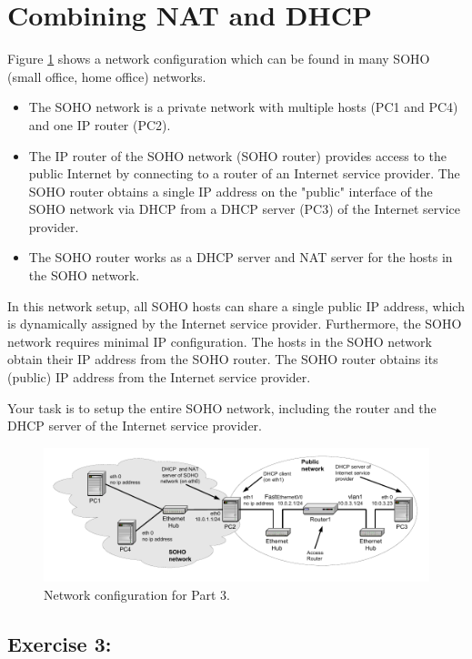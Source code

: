 \newpage
\section{Combining NAT and DHCP}

Figure \ref{fig:lab7-part3} shows a network configuration which can be found in many SOHO (small office, home office) networks.

\begin{itemize}
	\item The SOHO network is a private network with multiple hosts (PC1 and PC4) and one IP router (PC2).
	\item The IP router of the SOHO network (SOHO router) provides access to the public Internet by connecting to a router of an Internet service provider. The SOHO router obtains a single IP address on the "public" interface of the SOHO network via DHCP from a DHCP server (PC3) of the Internet service provider.
	\item The SOHO router works as a DHCP server and NAT server for the hosts in the SOHO network.
\end{itemize}

In this network setup, all SOHO hosts can share a single public IP address, which is dynamically assigned by the Internet service provider. Furthermore, the SOHO network requires minimal IP configuration. The hosts in the SOHO network obtain their IP address from the SOHO router. The SOHO router obtains its (public) IP address from the Internet service provider.

Your task is to setup the entire SOHO network, including the router and the DHCP server of the Internet service provider.

\begin{figure}[h!t]
	\centering
	\includegraphics{graphics/lab7-part3-updated.pdf}	
	\caption{Network configuration for Part 3.}
	\label{fig:lab7-part3}
\end{figure}

\subsection{Exercise 3:}

